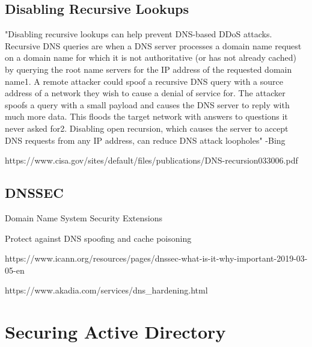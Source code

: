 \documentclass{article}
\begin{document}
\subsection{Disabling Recursive Lookups}
"Disabling recursive lookups can help prevent DNS-based DDoS attacks. 
Recursive DNS queries are when a DNS server processes a domain name 
request on a domain name for which it is not authoritative 
(or has not already cached) by querying the root name servers for 
the IP address of the requested domain name1. A remote attacker could 
spoof a recursive DNS query with a source address of a network they 
wish to cause a denial of service for. The attacker spoofs a query 
with a small payload and causes the DNS server to reply with much 
more data. This floods the target network with answers to questions 
it never asked for2. Disabling open recursion, which causes the server 
to accept DNS 
requests from any IP address, can reduce DNS attack loopholes" -Bing

https://www.cisa.gov/sites/default/files/publications/DNS-recursion033006.pdf

\subsection{DNSSEC}
Domain Name System Security Extensions

Protect against DNS spoofing and cache poisoning

https://www.icann.org/resources/pages/dnssec-what-is-it-why-important-2019-03-05-en

https://www.akadia.com/services/dns_hardening.html

\section{Securing Active Directory}
\end{document}
